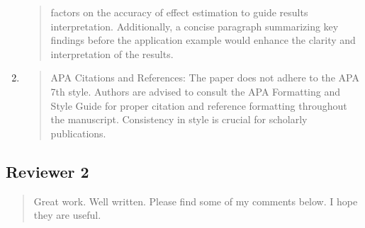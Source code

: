 \documentclass[]{article}
\begin{document}
\begin{enumerate}
\begin{quote}
factors on the accuracy of effect estimation to guide results interpretation. Additionally, a concise paragraph summarizing key
findings before the application example would enhance the clarity and
interpretation of the results.
\end{quote}
\item
  \begin{quote}
    APA Citations and References: The paper does not adhere to the APA 7th style. Authors are advised to consult the APA
    Formatting and Style Guide %
    for proper citation and reference formatting throughout the manuscript. Consistency in style is crucial
for scholarly publications.
\end{quote}

\end{enumerate}

\subsection{Reviewer 2}
\begin{quote}
Great work. Well written. Please find some of my comments below. I
hope they are useful.
\end{quote}
\end{document}
